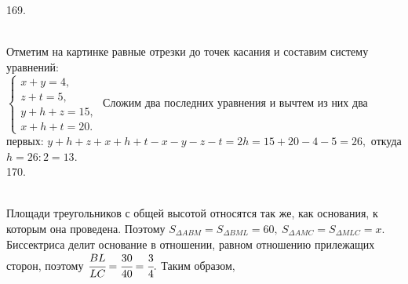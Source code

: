 \documentclass[12pt]{article}
\begin{document}
169. \begin{figure}[ht!]
\end{figure}\\
Отметим на картинке равные отрезки до точек касания и составим систему уравнений:\\ $\begin{cases}x+y=4,\\ z+t=5,\\ y+h+z=15,\\ x+h+t=20.\end{cases}$ Сложим два последних уравнения и вычтем из них два первых: $y+h+z+x+h+t-x-y-z-t=2h=15+20-4-5=26,$ откуда $h=26:2=13.$\\
170. \begin{figure}[ht!]
\end{figure}\\
Площади треугольников с общей высотой относятся так же, как основания, к которым она проведена. Поэтому $S_{\Delta ABM}=S_{\Delta BML}=60,\ S_{\Delta AMC}=S_{\Delta MLC}=x.$ Биссектриса делит основание в отношении, равном отношению прилежащих сторон, поэтому $\cfrac{BL}{LC}=\cfrac{30}{40}=\cfrac{3}{4}.$ Таким образом,
\end{document}
